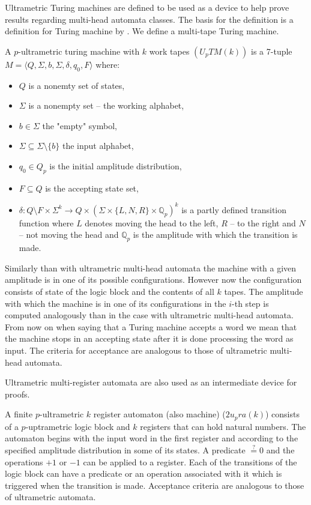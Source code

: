 \documentclass{llncs}
\begin{document}
Ultrametric Turing machines are defined to be used as a device to help prove results regarding multi-head automata classes. The basis for the definition is a definition for Turing machine by \citet{Hopcroft1979}. We define a multi-tape Turing machine.
\begin{definition}
A $p$-ultrametric turing machine with $k$ work tapes $(U_pTM(k))$ is a 7-tuple $M= \langle Q, \Sigma, b, \Sigma, \delta, q_0, F \rangle$ where:
\begin{itemize}
	\item $Q$ is a nonemty set of states,
	\item $\Sigma$ is a nonempty set -- the working alphabet,
	\item $b \in \Sigma$ the "empty" symbol,
	\item $\Sigma\subseteq\Sigma\setminus\{b\}$ the input alphabet,
	\item $q_0 \in Q_p$ is the initial amplitude distribution,
	\item $F \subseteq Q$ is the accepting state set,
	\item $\delta: Q \setminus F \times \Sigma^k \rightarrow Q \times \left(\Sigma \times \{L,N,R\} \times \mathbb{Q}_p \right)^k$ is a partly defined transition function where $L$ denotes moving the head to the left, $R$ -- to the right and $N$ -- not moving the head and $\mathbb{Q}_p$ is the amplitude with which the transition is made.
\end{itemize}
\end{definition}

Similarly than with ultrametric multi-head automata the machine with a given amplitude is in one of its possible configurations. However now the configuration consists of state of the logic block %
and the contents of all $k$ tapes. The amplitude with which the machine is in one of its configurations in the $i$-th step is computed analogously than in the case with ultrametric multi-head automata. From now on when saying that a Turing machine accepts a word we mean that the machine stops in an accepting state after it is done processing the word as input. The criteria for acceptance are analogous to those of ultrametric multi-head automata.

Ultrametric multi-register automata are also used as an intermediate device for proofs.
\begin{definition}
A finite $p$-ultrametric $k$ register automaton (also machine) ($2u_pra(k)$) consists of a $p$-uptrametric logic block and $k$ registers that can hold natural numbers. The automaton begins with the input word in the first register and according to the specified amplitude distribution in some of its states. A predicate $\stackrel{?}{=} 0$ and the operations $+1$ or $-1$ can be applied to a register. Each of the transitions of the logic block can have a predicate or an operation associated with it which is triggered when the transition is made. Acceptance criteria are analogous to those of ultrametric automata.
\end{definition}

{}


\end{document}
